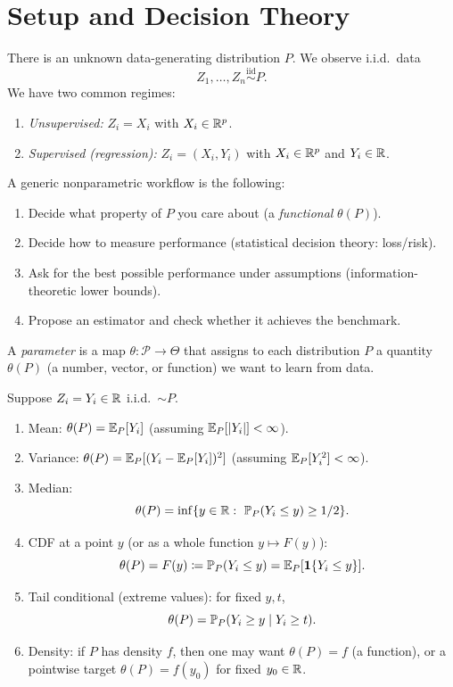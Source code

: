 
\section{Setup and Decision Theory}


\begin{notation}
	There is an unknown data-generating distribution $P$. We observe i.i.d.\ data
	\[
		Z_1,\dots,Z_n \overset{\mathrm{iid}}{\sim} P.
	\]
	We have two common regimes:
	\begin{enumerate}
		\item \emph{Unsupervised:} $Z_i = X_i$ with $X_i \in \R^p$.
		\item \emph{Supervised (regression):} $Z_i=(X_i,Y_i)$ with $X_i\in \R^p$ and $Y_i\in \R$.
	\end{enumerate}
\end{notation}

A generic nonparametric workflow is the following:
\begin{enumerate}
	\item Decide what property of $P$ you care about (a \emph{functional} $\theta(P)$).
	\item Decide how to measure performance (statistical decision theory: loss/risk).
	\item Ask for the best possible performance under assumptions (information-theoretic lower bounds).
	\item Propose an estimator and check whether it achieves the benchmark.
\end{enumerate}

\begin{definition}
	A \emph{parameter} is a map $\theta:\mathscr P \to \Theta$ that assigns to each distribution $P$ a quantity
	$\theta(P)$ (a number, vector, or function) we want to learn from data.
\end{definition}

\begin{example}
	Suppose $Z_i=Y_i\in \R$ i.i.d.\ $\sim P$.
	\begin{enumerate}
		\item Mean: $\theta(P)=\E_P[Y_i]$ (assuming $\E_P[|Y_i|]<\infty$).
		\item Variance: $\theta(P)=\E_P[(Y_i-\E_P[Y_i])^2]$ (assuming $\E_P[Y_i^2]<\infty$).
		\item Median:
		\[
			\theta(P)=\inf\{y\in\R:\ \P_P(Y_i\le y)\ge 1/2\}.
		\]
		\item CDF at a point $y$ (or as a whole function $y\mapsto F(y)$):
		\[
			\theta(P)=F(y)\coloneqq\P_P(Y_i\le y)=\E_P[\mathbf 1\{Y_i\le y\}].
		\]
		\item Tail conditional (extreme values): for fixed $y,t$,
		\[
			\theta(P)=\P_P(Y_i\ge y \mid Y_i\ge t).
		\]
		\item Density: if $P$ has density $f$, then one may want $\theta(P)=f$ (a function),
		or a pointwise target $\theta(P)=f(y_0)$ for fixed $y_0\in\R$.
	\end{enumerate}
\end{example}

